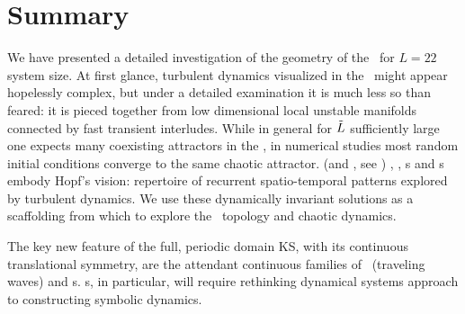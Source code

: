 
\section{Summary}
\label{sect:rpo-sum}

We have presented a detailed investigation
of the geometry of the
{\KS} \statesp\ for $L=22$ system size.
At first glance, turbulent dynamics visualized in the \statesp\ might appear
hopelessly complex, but under a detailed examination it is
much less so than feared: it is
pieced together from low dimensional %
local unstable manifolds connected by fast transient interludes.
While in general
for $\tilde{L}$ sufficiently large
one expects many
coexisting attractors in the \statesp%
,
in numerical studies most random initial
conditions converge to the same chaotic attractor.
{\KS} (and \pCf, see )  \eqva, \reqva, \po s and
\rpo s embody Hopf's vision:
repertoire of recurrent spatio-temporal
patterns explored by turbulent dynamics.
We use these dynamically invariant solutions
as a scaffolding from which to explore the
\statesp\  topology and chaotic dynamics.


The key new feature of the full, periodic domain
KS, with its continuous translational symmetry,
are the attendant continuous families of
\reqva\ (traveling waves) and \rpo s.
\Rpo s, in particular, will require rethinking dynamical systems
approach to constructing symbolic dynamics.




